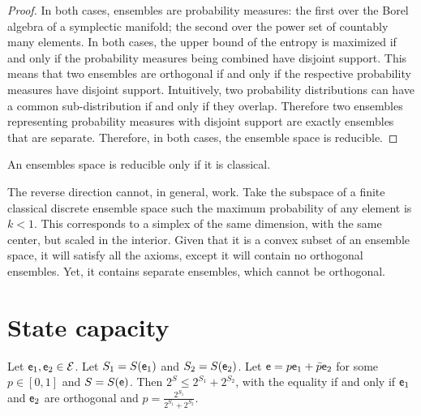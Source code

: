 \begin{proof}
	In both cases, ensembles are probability measures: the first over the Borel algebra of a symplectic manifold; the second over the power set of countably many elements. In both cases, the upper bound of the entropy is maximized if and only if the probability measures being combined have disjoint support. This means that two ensembles are orthogonal if and only if the respective probability measures have disjoint support. Intuitively, two probability distributions can have a common sub-distribution if and only if they overlap. Therefore two ensembles representing probability measures with disjoint support are exactly ensembles that are separate. Therefore, in both cases, the ensemble space is reducible.
\end{proof}

\begin{conj}
	An ensembles space is reducible only if it is classical.
\end{conj}

\begin{remark}
	The reverse direction cannot, in general, work. Take the subspace of a finite classical discrete ensemble space such the maximum probability of any element is $k < 1$. This corresponds to a simplex of the same dimension, with the same center, but scaled in the interior. Given that it is a convex subset of an ensemble space, it will satisfy all the axioms, except it will contain no orthogonal ensembles. Yet, it contains separate ensembles, which cannot be orthogonal.
\end{remark}

\section{State capacity}

\begin{prop}\label{pm_es_exponentialEntropySubadditivity}
	Let $\mathsf{e}_1, \mathsf{e}_2 \in \mathcal{E}$. Let $S_1 = S(\mathsf{e}_1)$ and $S_2 = S(\mathsf{e}_2)$. Let $\mathsf{e} = p \mathsf{e}_1 + \bar{p} \mathsf{e}_2$ for some $p \in [0,1]$ and $S = S(\mathsf{e})$. Then $2^S \leq 2^{S_1} + 2^{S_2}$, with the equality if and only if $\mathsf{e}_1$ and $\mathsf{e}_2$ are orthogonal and $p = \frac{2^{S_1}}{2^{S_1} + 2^{S_2}}$.
\end{prop}

